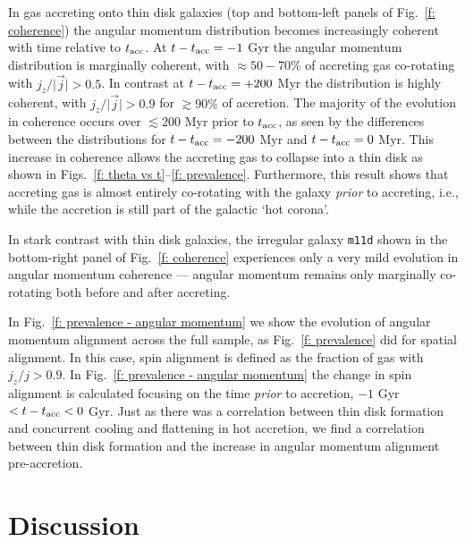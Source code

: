 \documentclass[fleqn,usenatbib]{mnras}
\newcommand{\tacc}{t_{\rm acc}}
\begin{document}
In gas accreting onto thin disk galaxies (top and bottom-left panels of Fig.~\ref{f: coherence}) the angular momentum distribution becomes increasingly coherent with time relative to $\tacc$.
At $t-\tacc=-1$ Gyr the angular momentum distribution is marginally coherent, with $\approx50-70\%$ of accreting gas co-rotating with $j_z/\vert \vec j \vert > 0.5$.
In contrast at $t-\tacc=+200$ Myr the distribution is highly coherent, with $j_z/\vert \vec j \vert > 0.9$ for $\gtrsim 90\%$ of accretion.
The majority of the evolution in coherence occurs over $\lesssim 200$ Myr prior to $\tacc$, as seen by the differences between the distributions for $t-\tacc=-200$ Myr and $t-\tacc=0$ Myr.
This increase in coherence allows the accreting gas to collapse into a thin disk as shown in Figs.~\ref{f: theta vs t}--\ref{f: prevalence}.
Furthermore, this result shows that accreting gas is almost entirely co-rotating with the galaxy {\em prior} to accreting, i.e., while the accretion is still part of the galactic `hot corona'. 

In stark contrast with thin disk galaxies, the irregular galaxy \texttt{m11d} shown in the bottom-right panel of Fig.~\ref{f: coherence} experiences only a very mild evolution in angular momentum coherence --- angular momentum remains only marginally co-rotating both before and after accreting.

In Fig.~\ref{f: prevalence - angular momentum} we show the evolution of angular momentum alignment across the full sample, as Fig.~\ref{f: prevalence} did for spatial alignment. 
In this case, spin alignment is defined as the fraction of gas with $j_z/j > 0.9$.
In Fig.~\ref{f: prevalence - angular momentum} the change in spin alignment is calculated focusing on the time \textit{prior} to accretion, $-1$ Gyr $< t - \tacc < 0$ Gyr.
Just as there was a correlation between thin disk formation and concurrent cooling and flattening in hot accretion, we find a correlation between thin disk formation and the increase in angular momentum alignment pre-accretion.

\section{Discussion}
\label{s: discussion}
\end{document}
